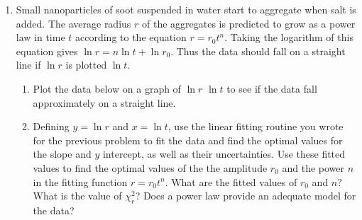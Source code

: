 \documentclass[letterpaper,10pt,english]{sphinxmanual}
\begin{document}
\begin{enumerate}
\item {} 
\sphinxAtStartPar
Small nanoparticles of soot suspended in water start to aggregate when salt is added.  The average radius \(r\) of the aggregates is predicted to grow as a power law in time \(t\) according to the equation \(r = r_0t^n\).  Taking the logarithm of this equation gives \(\ln r = n\ln t + \ln r_0\).  Thus the data should fall on a straight line if \(\ln r\) is plotted  \(\ln t\).
\begin{enumerate}
%
\item {} 
\sphinxAtStartPar
Plot the data below on a graph of \(\ln r\)  \(\ln t\) to see if the data fall approximately on a straight line.

\begin{sphinxVerbatim}[commandchars=\\\{\},numbers=left,firstnumber=1,stepnumber=1]
   
 
         
          
                   
                   
                   
                   
                   
                   
                 
                 
\end{sphinxVerbatim}

\item {} 
\sphinxAtStartPar
Defining \(y = \ln r\) and \(x = \ln t\), use the linear fitting routine you wrote for the previous problem to fit the data and find the optimal values for the slope and \(y\) intercept, as well as their uncertainties.  Use these fitted values to find the optimal values of the the amplitude \(r_0\) and the power \(n\) in the fitting function \(r = r_0t^n\).  What are the fitted values of \(r_0\) and \(n\)?  What is the value of \(\chi_r^2\)?  Does a power law provide an adequate model for the data?


\end{enumerate}
\end{enumerate}
\end{document}
